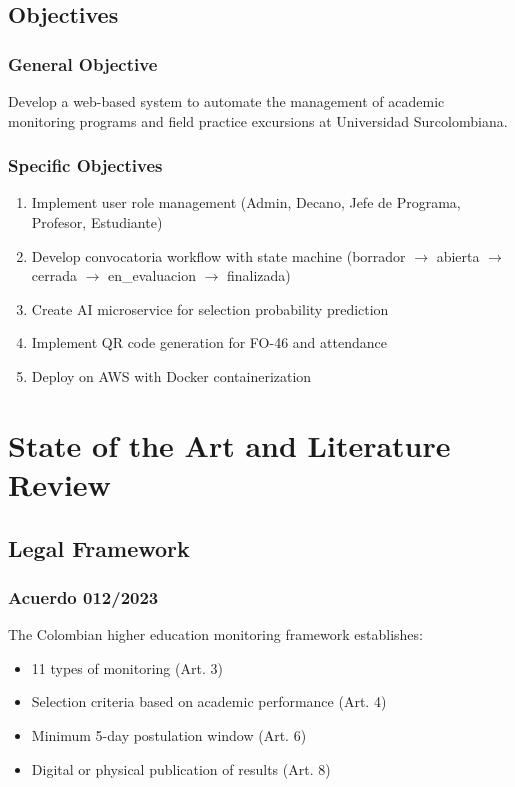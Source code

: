 \documentclass[12pt,a4paper]{report}
\begin{document}
\section{Objectives}

\subsection{General Objective}
Develop a web-based system to automate the management of academic monitoring programs and field practice excursions at Universidad Surcolombiana.

\subsection{Specific Objectives}
\begin{enumerate}
    \item Implement user role management (Admin, Decano, Jefe de Programa, Profesor, Estudiante)
    \item Develop convocatoria workflow with state machine (borrador $\rightarrow$ abierta $\rightarrow$ cerrada $\rightarrow$ en\_evaluacion $\rightarrow$ finalizada)
    \item Create AI microservice for selection probability prediction
    \item Implement QR code generation for FO-46 and attendance
    \item Deploy on AWS with Docker containerization
\end{enumerate}

\chapter{State of the Art and Literature Review}

\section{Legal Framework}

\subsection{Acuerdo 012/2023}
The Colombian higher education monitoring framework establishes:
\begin{itemize}
    \item 11 types of monitoring (Art. 3)
    \item Selection criteria based on academic performance (Art. 4)
    \item Minimum 5-day postulation window (Art. 6)
    \item Digital or physical publication of results (Art. 8)
\end{itemize}
\end{document}
